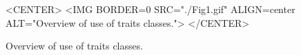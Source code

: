 \begin{figure}[t]
\begin{ccTexOnly}

\begin{center}
\leavevmode
\vspace*{6cm}
\hspace*{-2cm}
\end{center}
\vspace*{-8cm}
\caption{Overview of use of traits classes.
\label{ASPAS:Fig1}}
\end{ccTexOnly}
\lcHtml{\label{ASPAS:Fig1}}
\begin{ccHtmlOnly}
<CENTER>
<IMG BORDER=0 SRC="./Fig1.gif" ALIGN=center ALT="Overview of use of traits classes.">
</CENTER>
\end{ccHtmlOnly}
\end{figure}






